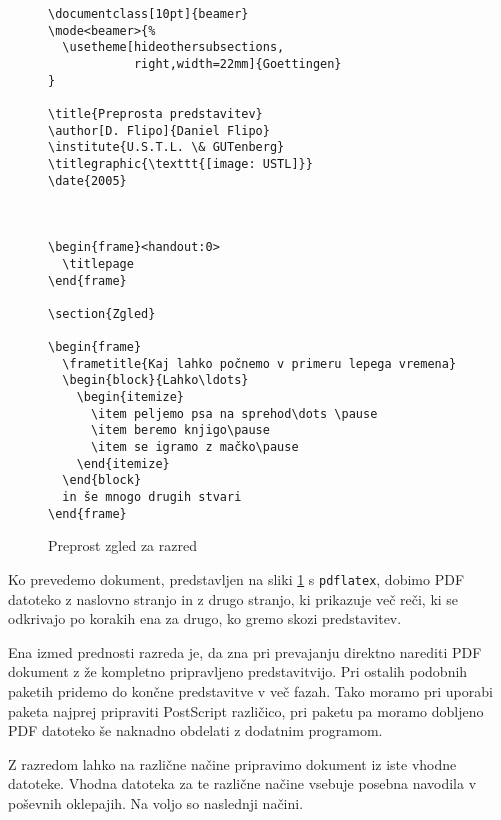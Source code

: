 \begin{figure}[htbp]
\begin{verbatim}
\documentclass[10pt]{beamer}
\mode<beamer>{%
  \usetheme[hideothersubsections,
            right,width=22mm]{Goettingen}
}

\title{Preprosta predstavitev}
\author[D. Flipo]{Daniel Flipo}
\institute{U.S.T.L. \& GUTenberg}
\titlegraphic{\texttt{[image: USTL]}}
\date{2005}



\begin{frame}<handout:0>
  \titlepage
\end{frame}

\section{Zgled}

\begin{frame}
  \frametitle{Kaj lahko počnemo v primeru lepega vremena}
  \begin{block}{Lahko\ldots}
    \begin{itemize}
      \item peljemo psa na sprehod\dots \pause
      \item beremo knjigo\pause
      \item se igramo z mačko\pause
    \end{itemize}
  \end{block}
  in še mnogo drugih stvari
\end{frame}

\end{verbatim}
  \caption{Preprost zgled za razred }
  \label{fig:code-beamer}
\end{figure}

Ko prevedemo dokument, predstavljen na sliki \ref{fig:code-beamer}
s \texttt{pdflatex}, dobimo PDF datoteko z naslovno stranjo in
z drugo stranjo, ki prikazuje več reči, ki se odkrivajo po korakih 
ena za drugo, ko gremo skozi predstavitev.

Ena izmed prednosti razreda  je, da zna pri prevajanju direktno narediti PDF dokument z 
že kompletno pripravljeno predstavitvijo. Pri ostalih podobnih paketih
pridemo do končne predstavitve v več fazah. Tako moramo pri uporabi 
paketa  najprej pripraviti PostScript različico, pri paketu
 pa moramo dobljeno PDF datoteko še naknadno obdelati z
dodatnim programom.

Z razredom  lahko na različne načine pripravimo dokument iz
iste vhodne datoteke. Vhodna datoteka za te različne načine vsebuje
posebna navodila v poševnih oklepajih. Na voljo so naslednji
načini.

